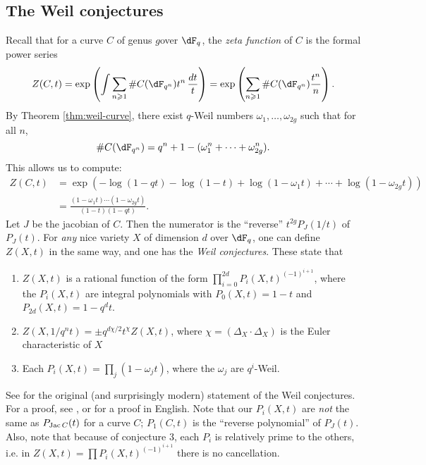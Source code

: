 \subsection{The Weil conjectures}

Recall that for a curve $C$ of genus $g$over $\dF_q$, the \emph{zeta function} 
of $C$ is the formal power series 
\[
  Z(C,t) = \exp\left(\int \sum_{n\geqslant 1} \# C(\dF_{q^n}) t^n\, \frac{dt}{t}\right)
    = \exp\left( \sum_{n\geqslant 1} \# C(\dF_{q^n}) \frac{t^n}{n}\right) \text{.}
\]
By Theorem \ref{thm:weil-curve}, there exist $q$-Weil numbers 
$\omega_1,\dots,\omega_{2 g}$ such that for all $n$, 
\[
  \# C(\dF_{q^n}) = q^n+1 - (\omega_1^n + \cdots + \omega_{2 g}^n) \text{.}
\]
This allows us to compute:
\begin{align*}
  Z(C,t) &= \exp(-\log(1-q t) - \log(1-t) + \log(1-\omega_1 t) + \cdots + \log(1-\omega_{2 g} t)) \\
    &= \frac{(1-\omega_1 t)\cdots (1-\omega_{2g} t)}{(1-t)(1-q t)} \text{.}
\end{align*}
Let $J$ be the jacobian of $C$. Then the numerator is the 
``reverse'' $t^{2g} P_J(1/t)$ of $P_J(t)$. For 
\emph{any} nice variety $X$ of dimension $d$ over $\dF_q$, one can define 
$Z(X,t)$ in the same way, and one has the \emph{Weil conjectures}. These state 
that 
\begin{enumerate}
  \item $Z(X,t)$ is a rational function of the form 
    $\prod_{i=0}^{2 d} P_i(X,t)^{(-1)^{i+1}}$, where the $P_i(X,t)$ are 
    integral polynomials with $P_0(X,t)=1-t$ and $P_{2 d}(X,t) = 1-q^d t$. 
  \item $Z(X,1/q^n t) = \pm q^{d\chi/2} t^\chi Z(X,t)$, where 
    $\chi=(\Delta_X\cdot \Delta_X)$ is the Euler characteristic of $X$
  \item Each $P_i(X,t) = \prod_j (1 - \omega_j t)$, where the $\omega_j$  are 
    $q^i$-Weil. 
\end{enumerate}
See \cite{we49} for the original (and surprisingly modern) statement of the 
Weil conjectures. For a proof, see \cite{de74}, or \cite{mi-ec} for a proof in 
English. Note that our $P_i(X,t)$ are \emph{not} the same as 
$P_{\operatorname{Jac} C}(t)$ for a curve $C$; $P_1(C,t)$ is the ``reverse polynomial'' of 
$P_J(t)$. Also, note that because of conjecture 3, each 
$P_i$ is relatively prime to the others, i.e. in 
$Z(X,t) = \prod P_i(X,t)^{(-1)^{i+1}}$ there is no cancellation. 

